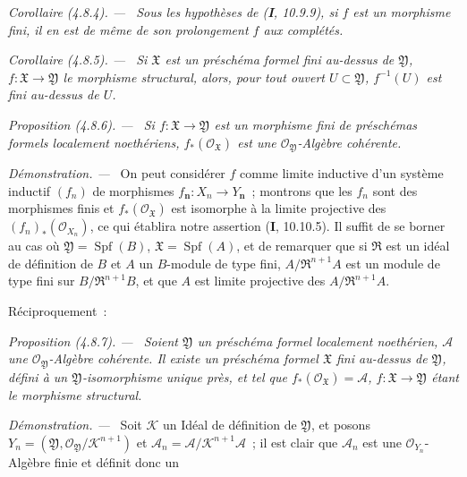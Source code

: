 \documentclass[10pt,oneside]{book}
\newenvironment{proposition}[1][]{%
  \par\medskip\noindent\itshape Proposition (#1). ---\ }{\par}
\newenvironment{corollary}[1][]{%
  \par\medskip\noindent\itshape Corollaire (#1). ---\ }{\par}
\newenvironment{proof}{%
  \par\medskip\noindent\textit{Démonstration. ---\ }}{\par}
\begin{document}
\begin{corollary}[4.8.4]
\label{III.4.8.4-fr}
Sous les hypothèses de \textup{(\textbf{I}, 10.9.9)}, si $f$ est un morphisme fini, il en est de
même de son prolongement $\widehat f$ aux complétés.
\end{corollary}

\begin{corollary}[4.8.5]
\label{III.4.8.5-fr}
Si $\mathfrak X$ est un préschéma formel fini au-dessus de $\mathfrak Y$,
$f:\mathfrak X\to\mathfrak Y$ le morphisme structural, alors, pour tout ouvert
$U\subset\mathfrak Y$, $f^{-1}(U)$ est fini au-dessus de $U$.
\end{corollary}

\begin{proposition}[4.8.6]
\label{III.4.8.6-fr}
Si $f:\mathfrak X\to\mathfrak Y$ est un morphisme fini de préschémas formels
localement noethériens, $f_*(\mathcal O_{\mathfrak X})$ est une
$\mathcal O_{\mathfrak Y}$-Algèbre cohérente.
\end{proposition}

\begin{proof}
On peut considérer $f$ comme limite inductive d'un système inductif $(f_n)$ de
morphismes $f_{\boldsymbol{n}}:X_n\to Y_{\boldsymbol{n}}$~; montrons que les $f_n$ sont des morphismes finis
et $f_*(\mathcal O_{\mathfrak X})$ est isomorphe à la limite projective des
$(f_n)_*(\mathcal O_{X_n})$, ce qui établira notre assertion (\textbf{I}, 10.10.5). Il
suffit de se borner au cas où $\mathfrak Y=\operatorname{Spf}(B)$,
$\mathfrak X=\operatorname{Spf}(A)$, et de remarquer que si $\mathfrak R$ est
un idéal de définition de $B$ et $A$ un $B$-module de type fini,
$A/\mathfrak R^{n+1}A$ est un module de type fini sur
$B/\mathfrak R^{n+1}B$, et que $A$ est limite projective des
$A/\mathfrak R^{n+1}A$.
\end{proof}

Réciproquement~:

\begin{proposition}[4.8.7]
\label{III.4.8.7-fr}
Soient $\mathfrak Y$ un préschéma formel localement noethérien, $\mathcal A$
une $\mathcal O_{\mathfrak Y}$-Algèbre cohérente. Il existe un préschéma
formel $\mathfrak X$ fini au-dessus de $\mathfrak Y$, défini à un
$\mathfrak Y$-isomorphisme unique près, et tel que
$f_*(\mathcal O_{\mathfrak X})=\mathcal A$, $f:\mathfrak X\to\mathfrak Y$
étant le morphisme structural.
\end{proposition}

\begin{proof}
Soit $\mathcal K$ un Idéal de définition de $\mathfrak Y$, et posons
$Y_n=(\mathfrak Y,\mathcal O_{\mathfrak Y}/\mathcal K^{n+1})$ et
$\mathcal A_n=\mathcal A/\mathcal K^{n+1}\mathcal A$~;
il est clair que $\mathcal A_n$ est une $\mathcal O_{Y_n}$-Algèbre finie et
définit donc un

\end{proof}
\end{document}
